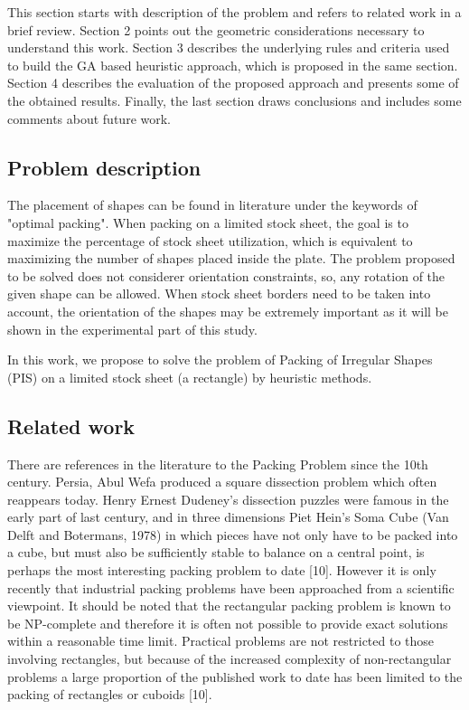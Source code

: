 \documentclass{llncs}
\begin{document}
This section starts with description of the problem and refers to related work in a brief review. Section 2 points out the geometric considerations necessary to understand this work. Section 3 describes the underlying rules and criteria used to build the GA based heuristic approach, which is proposed in the same section. Section 4 describes the evaluation of the proposed approach and presents some of the obtained results. Finally, the last section draws conclusions and includes some comments about future work.
%
\subsection{Problem description}
%
The placement of shapes can be found in literature under the keywords of "optimal packing". When packing on a limited stock sheet, the
goal is to maximize the percentage of stock sheet utilization, which is equivalent to maximizing the number of shapes placed inside the plate. The problem proposed to be solved does not considerer orientation constraints, so, any rotation of the given shape can be allowed. When stock sheet borders need to be taken into account, the orientation of the shapes may be extremely important as it will be shown in the experimental part of this study.

In this work, we propose to solve the problem of Packing of Irregular Shapes (PIS) on a limited stock sheet (a rectangle) by heuristic methods.
%
\subsection{Related work}
%
There are references in the literature to the Packing Problem since the 10th century. Persia, Abul Wefa produced a square dissection problem which often reappears today. Henry Ernest Dudeney's dissection puzzles were famous in the early part of last century, and in three dimensions Piet Hein's Soma Cube (Van Delft and Botermans, 1978) in which pieces have not only have to be packed into a cube, but must also be sufficiently stable to balance on a central point, is perhaps the most interesting packing problem to date [10]. However it is only recently that industrial packing problems have been approached from a scientific viewpoint. It should be noted that the rectangular packing problem is known to be NP-complete and therefore it is often not possible to provide exact solutions within a reasonable time limit. Practical problems are not restricted to those involving rectangles, but because of the increased complexity of non-rectangular problems a large proportion of the published work to date has been limited to the packing of rectangles or cuboids [10]. 
%
\end{document}
